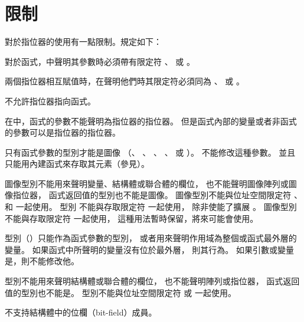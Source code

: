 \section[sec:restrictions]{限制}

\startigBig

\startitem
對於指位器的使用有一點限制。規定如下：
\startigBig

\startitem
對於函式，中聲明其參數時必須帶有限定符
 、  或 。
\stopitem

\startitem
兩個指位器相互賦值時，在聲明他們時其限定符必須同為
 、  或 。
\stopitem

\startitem
不允許指位器指向函式。
\stopitem

\startitem
在中，函式的參數不能聲明為指位器的指位器。
但是函式內部的變量或者非函式的參數可以是指位器的指位器。
\stopitem

\stopigBig
\stopitem

\startitem
只有函式參數的型別才能是圖像
（、 、 、
、  或 ）。
不能修改這種參數。
並且只能用內建函式來存取其元素（參見）。

圖像型別不能用來聲明變量、結構體或聯合體的欄位，
也不能聲明圖像陣列或圖像指位器，
函式返回值的型別也不能是圖像。
圖像型別不能與位址空間限定符
 、  和  一起使用。
型別  不能與存取限定符  一起使用，
除非使能了擴展 。
圖像型別不能與存取限定符  一起使用，
這種用法暫時保留，將來可能會使用。

型別（）只能作為函式參數的型別，
或者用來聲明作用域為整個或函式最外層的變量。
如果函式中所聲明的變量沒有位於最外層，
則其行為。
如果引數或變量是，則不能修改他。

型別不能用來聲明結構體或聯合體的欄位，
也不能聲明陣列或指位器，
函式返回值的型別也不能是。
型別不能與位址空間限定符  或  一起使用。
\stopitem

不支持結構體中的位欄（bit-field）成員。
\stopitem

